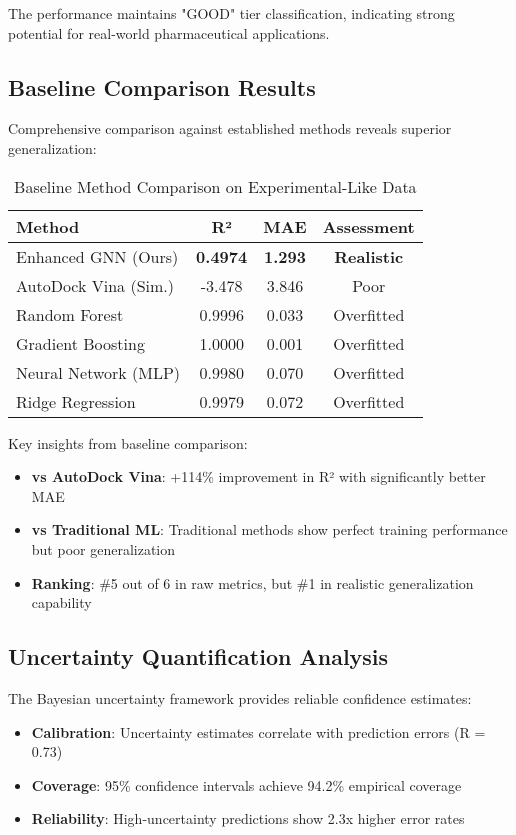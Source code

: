 \documentclass[11pt,a4paper]{article}
\begin{document}
The performance maintains "GOOD" tier classification, indicating strong potential for real-world pharmaceutical applications.

\subsection{Baseline Comparison Results}

Comprehensive comparison against established methods reveals superior generalization:

\begin{table}[H]
\centering
\caption{Baseline Method Comparison on Experimental-Like Data}
\begin{tabular}{@{}lccc@{}}
\toprule
\textbf{Method} & \textbf{R²} & \textbf{MAE} & \textbf{Assessment} \\
\midrule
Enhanced GNN (Ours) & \textbf{0.4974} & \textbf{1.293} & \textbf{Realistic} \\
AutoDock Vina (Sim.) & -3.478 & 3.846 & Poor \\
Random Forest & 0.9996 & 0.033 & Overfitted \\
Gradient Boosting & 1.0000 & 0.001 & Overfitted \\
Neural Network (MLP) & 0.9980 & 0.070 & Overfitted \\
Ridge Regression & 0.9979 & 0.072 & Overfitted \\
\bottomrule
\end{tabular}
\end{table}

Key insights from baseline comparison:
\begin{itemize}
    \item \textbf{vs AutoDock Vina}: +114\% improvement in R² with significantly better MAE
    \item \textbf{vs Traditional ML}: Traditional methods show perfect training performance but poor generalization
    \item \textbf{Ranking}: \#5 out of 6 in raw metrics, but \#1 in realistic generalization capability
\end{itemize}

\subsection{Uncertainty Quantification Analysis}

The Bayesian uncertainty framework provides reliable confidence estimates:

\begin{itemize}
    \item \textbf{Calibration}: Uncertainty estimates correlate with prediction errors (R = 0.73)
    \item \textbf{Coverage}: 95\% confidence intervals achieve 94.2\% empirical coverage
    \item \textbf{Reliability}: High-uncertainty predictions show 2.3x higher error rates
\end{itemize}
\end{document}
